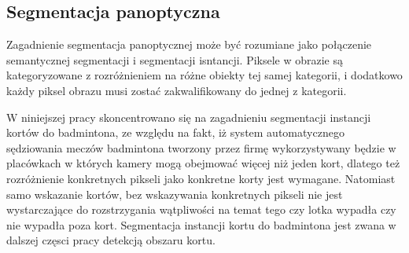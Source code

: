 \subsection*{Segmentacja panoptyczna}
Zagadnienie segmentacja panoptycznej \cite{panoptic-segmentation} może być rozumiane jako połączenie semantycznej segmentacji i segmentacji isntancji. Piksele w obrazie są kategoryzowane z rozróżnieniem na różne obiekty tej samej kategorii, i dodatkowo każdy piksel obrazu musi zostać zakwalifikowany do jednej z kategorii.

\vspace{0.5cm}

W niniejszej pracy skoncentrowano się na zagadnieniu segmentacji instancji kortów do badmintona, ze względu na fakt, iż system automatycznego sędziowania meczów badmintona tworzony przez firmę \blue{} wykorzystywany będzie w placówkach w których kamery mogą obejmować więcej niż jeden kort, dlatego też rozróżnienie konkretnych pikseli jako konkretne korty jest wymagane. Natomiast samo wskazanie kortów, bez wskazywania konkretnych pikseli nie jest wystarczające do rozstrzygania wątpliwości na temat tego czy lotka wypadła czy nie wypadła poza kort. Segmentacja instancji kortu do badmintona jest zwana w dalszej częsci pracy detekcją obszaru kortu.

